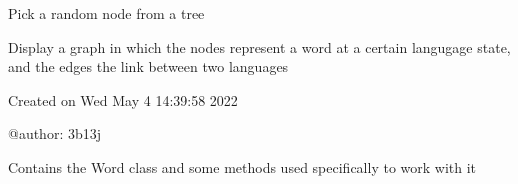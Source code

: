 \documentclass[letterpaper,10pt,english]{sphinxmanual}
\begin{document}
\begin{fulllineitems}
\begin{fulllineitems}
\label{\detokenize{index:Tree.L_tree.pick_a_node}}
\sphinxAtStartPar
Pick a random node from a tree

\end{fulllineitems}


\begin{fulllineitems}
\label{\detokenize{index:Tree.L_tree.print_history_to_graph}}
\sphinxAtStartPar
Display a graph in which the nodes represent a word at a certain langugage state, and the edges the link between two languages

\end{fulllineitems}


\end{fulllineitems}

\label{\detokenize{index:module-Word}}
\sphinxAtStartPar
Created on Wed May  4 14:39:58 2022

\sphinxAtStartPar
@author: 3b13j

\sphinxAtStartPar
Contains the Word class and some methods used specifically to work with it
\end{document}
